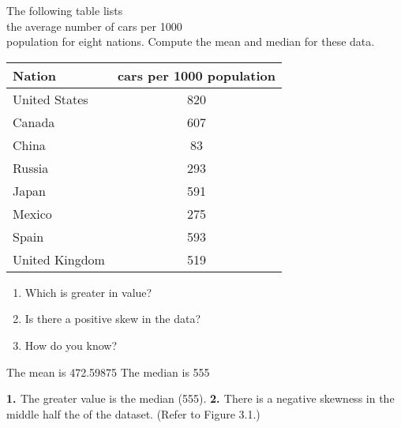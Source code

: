 \documentclass[11pt]{book}\usepackage[]{graphicx}\usepackage[]{color}
\begin{document}
\begin{exercises}
  \begin{exercise} %

    The following table lists \\ the average number of cars per 1000 \\ population for eight nations. Compute the mean and median for these data.

  {\small{
   \begin{tabular}{@{} lc @{}} \hline  %
   Nation & cars per 1000 population \\ \hline
   United States & 820 \\
   Canada & 607 \\
   China & 83 \\
   Russia & 293 \\
   Japan & 591 \\
   Mexico & 275 \\
   Spain & 593 \\
   United Kingdom & 519 \\ \hline
   \end{tabular}
  }}


  \begin{enumerate}
  \item Which is greater in value?
  \item Is there a positive skew in the data?
  \item How do you know?
  \end{enumerate}

  \end{exercise}
  \begin{solution}   %




    The mean is 472.59875
    The median is 555

{\bf{1. }} The greater value is the median (555).  {\bf{2. }} There is a negative skewness in the middle half the of the dataset.  (Refer to Figure 3.1.)


\end{solution}
\end{exercises}
\end{document}
